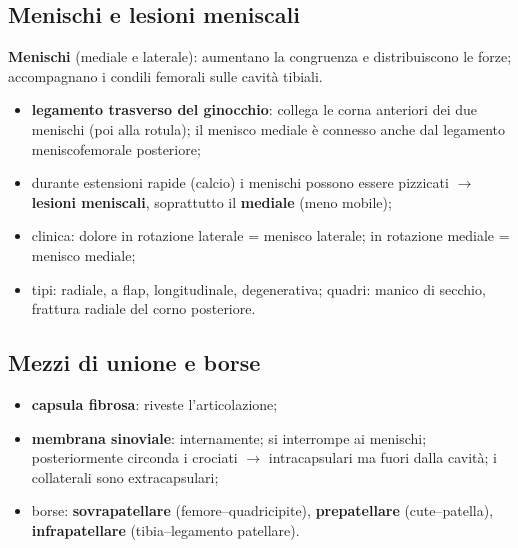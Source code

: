 \subsection{Menischi e lesioni meniscali}
\textbf{Menischi} (mediale e laterale): aumentano la congruenza e distribuiscono le forze;
accompagnano i condili femorali sulle cavità tibiali.
\begin{itemize}
  \item \textbf{legamento trasverso del ginocchio}: collega le corna anteriori dei due menischi (poi
    alla rotula); il menisco mediale è connesso anche dal legamento meniscofemorale posteriore;
  \item durante estensioni rapide (calcio) i menischi possono essere pizzicati $\rightarrow$
    \textbf{lesioni meniscali}, soprattutto il \textbf{mediale} (meno mobile);
  \item clinica: dolore in rotazione laterale = menisco laterale; in rotazione mediale = menisco
    mediale;
  \item tipi: radiale, a flap, longitudinale, degenerativa; quadri: manico di secchio, frattura
    radiale del corno posteriore.
\end{itemize}

\subsection{Mezzi di unione e borse}
\begin{itemize}
  \item \textbf{capsula fibrosa}: riveste l'articolazione;
  \item \textbf{membrana sinoviale}: internamente; si interrompe ai menischi; posteriormente circonda
    i crociati $\rightarrow$ intracapsulari ma fuori dalla cavità; i collaterali sono extracapsulari;
  \item borse: \textbf{sovrapatellare} (femore--quadricipite), \textbf{prepatellare} (cute--patella),
    \textbf{infrapatellare} (tibia--legamento patellare).
\end{itemize}

